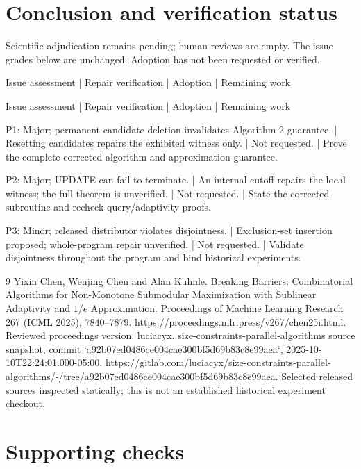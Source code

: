 \documentclass[10pt]{article}
\begin{document}
\section*{Conclusion and verification status}
Scientific adjudication remains pending; human reviews are empty. The issue grades below are unchanged. Adoption has not been requested or verified.\par
Issue assessment | Repair verification | Adoption | Remaining work\par
Issue assessment | Repair verification | Adoption | Remaining work\par
P1: Major; permanent candidate deletion invalidates Algorithm 2 guarantee. | Resetting candidates repairs the exhibited witness only. | Not requested. | Prove the complete corrected algorithm and approximation guarantee.\par
P2: Major; UPDATE can fail to terminate. | An internal cutoff repairs the local witness; the full theorem is unverified. | Not requested. | State the corrected subroutine and recheck query/adaptivity proofs.\par
P3: Minor; released distributor violates disjointness. | Exclusion-set insertion proposed; whole-program repair unverified. | Not requested. | Validate disjointness throughout the program and bind historical experiments.\par
9 Yixin Chen, Wenjing Chen and Alan Kuhnle. Breaking Barriers: Combinatorial Algorithms for Non-Monotone Submodular Maximization with Sublinear Adaptivity and \(1/e\) Approximation. Proceedings of Machine Learning Research 267 (ICML 2025), 7840–7879. https://proceedings.mlr.press/v267/chen25i.html. Reviewed proceedings version. luciacyx. size-constraints-parallel-algorithms source snapshot, commit `a92b07ed0486ce004cae300bf5d69b83c8e99aea`, 2025-10-10T22:24:01.000-05:00. https://gitlab.com/luciacyx/size-constraints-parallel-algorithms/-/tree/a92b07ed0486ce004cae300bf5d69b83c8e99aea. Selected released sources inspected statically; this is not an established historical experiment checkout.\par
\section*{Supporting checks}
\end{document}
